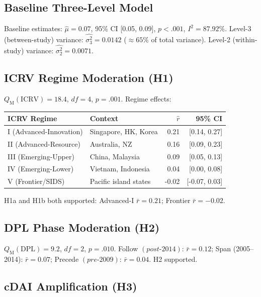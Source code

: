 \documentclass[review,authoryear]{elsarticle}
\newcommand{\rbar}{\bar{r}}                 %
\newcommand{\Isq}{I^{2}}                    %
\newcommand{\ICRV}{\mathrm{ICRV}}
\newcommand{\DPL}{\mathrm{DPL}}
\newcommand{\QM}{Q_{\mathrm{M}}}
\newcommand{\sigmasqtwo}{\sigma^{2}_{2}}     %
\newcommand{\sigmasqthree}{\sigma^{2}_{3}}   %
\begin{document}
\subsection{Baseline Three-Level Model}

Baseline estimates: \(\hat{\mu} = 0.07\), 95\% CI [0.05, 0.09],
\(p < .001\), \(\Isq = 87.92\%\).
Level-3 (between-study) variance: \(\hat{\sigmasqthree} = 0.0142\)
(\(\approx 65\%\) of total variance).
Level-2 (within-study) variance: \(\hat{\sigmasqtwo} = 0.0071\).

\subsection{ICRV Regime Moderation (H1)}

\(\QM(\ICRV) = 18.4\), \(df = 4\), \(p = .001\).  Regime effects:
\begin{center}
  \begin{tabular}{llrr}
    \toprule
    ICRV Regime & Context & \(\hat{r}\) & 95\% CI \\
    \midrule
    I (Advanced-Innovation) & Singapore, HK, Korea & 0.21 & [0.14, 0.27] \\
    II (Advanced-Resource)  & Australia, NZ        & 0.16 & [0.09, 0.23] \\
    III (Emerging-Upper)    & China, Malaysia       & 0.09 & [0.05, 0.13] \\
    IV (Emerging-Lower)     & Vietnam, Indonesia    & 0.04 & [0.00, 0.08] \\
    V (Frontier/SIDS)       & Pacific island states & -0.02 & [-0.07, 0.03] \\
    \bottomrule
  \end{tabular}
\end{center}
H1a and H1b both supported: Advanced-I \(\rbar = 0.21\); Frontier \(\rbar = -0.02\).

\subsection{DPL Phase Moderation (H2)}

\(\QM(\DPL) = 9.2\), \(df = 2\), \(p = .010\).
Follow \((post\text{-}2014)\): \(\rbar = 0.12\);
Span (2005--2014): \(\rbar = 0.07\);
Precede \((pre\text{-}2009)\): \(\rbar = 0.04\).
H2 supported.

\subsection{cDAI Amplification (H3)}
\end{document}
